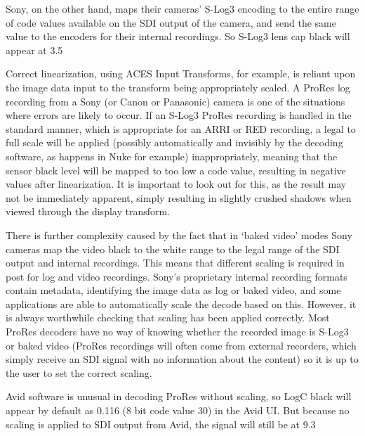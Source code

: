 Sony, on the other hand, maps their cameras' S-Log3 encoding to the entire range of code values available on the SDI output of the camera, and send the same value to the encoders for their internal recordings. So S-Log3 lens cap black will appear at 3.5%



Correct linearization, using ACES Input Transforms, for example, is reliant upon the image data input to the transform being appropriately scaled. A ProRes log recording from a Sony (or Canon or Panasonic) camera is one of the situations where errors are likely to occur. If an S-Log3 ProRes recording is handled in the standard manner, which is appropriate for an ARRI or RED recording, a legal to full scale will be applied (possibly automatically and invisibly by the decoding software, as happens in Nuke for example) inappropriately, meaning that the sensor black level will be mapped to too low a code value, resulting in negative values after linearization. It is important to look out for this, as the result may not be immediately apparent, simply resulting in slightly crushed shadows when viewed through the display transform.

There is further complexity caused by the fact that in ‘baked video’ modes Sony cameras map the video black to the white range to the legal range of the SDI output and internal recordings. This means that different scaling is required in post for log and video recordings. Sony's proprietary internal recording formats contain metadata, identifying the image data as log or baked video, and some applications are able to automatically scale the decode based on this. However, it is always worthwhile checking that scaling has been applied correctly.  Most ProRes decoders have no way of knowing whether the recorded image is S-Log3 or baked video (ProRes recordings will often come from external recorders, which simply receive an SDI signal with no information about the content) so it is up to the user to set the correct scaling.

Avid software is unusual in decoding ProRes without scaling, so LogC black will appear by default as 0.116 (8 bit code value 30) in the Avid UI. But because no scaling is applied to SDI output from Avid, the signal will still be at 9.3%

